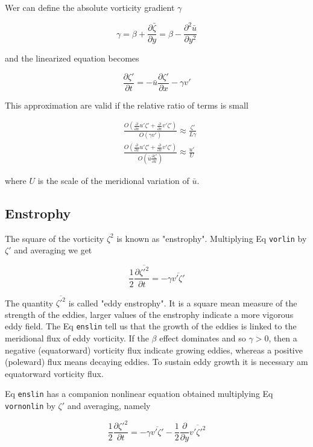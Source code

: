 Wer can define the absolute vorticity gradient \(\gamma\)

\[\gamma = \beta + \frac{\partial \bar{\zeta}}{\partial y} = \beta - \frac{\partial^{2} \bar{u}}{\partial y^{2}}\]

and the linearized equation becomes

{\[\frac{\partial \zeta'}{\partial t} = -\bar{u}\frac{\partial \zeta'}{\partial x} -\gamma v'\]}

This approximation are valid if the relative ratio of terms is small

\[\begin{aligned}
&\frac{O(\frac{\partial }{\partial x}u'\zeta'+ \frac{\partial }{\partial x} v'\zeta')}{O(\gamma v')} \approx \frac{\zeta'}{L\gamma} \\
&\frac{O(\frac{\partial }{\partial x}u'\zeta'+ \frac{\partial }{\partial x} v'\zeta')}{O(\bar{u}\frac{\partial \zeta'}{\partial x})} \approx \frac{u'}{U}
\end{aligned}\]

where \(U\) is the scale of the meridional variation of \(\bar{u}\).

\subsection{Enstrophy}\label{enstrophy}

The square of the vorticity \(\zeta^2\) is known as "enstrophy".
Multiplying Eq \texttt{vorlin} by \(\zeta'\) and averaging we get

{\[\frac{1}{2}\frac{\partial \overline{\zeta'^2}}{\partial t} = -\gamma\overline{v'\zeta'}\]}

The quantity \(\overline{\zeta'^2}\) is called "eddy enstrophy". It is a
square mean measure of the strength of the eddies, larger values of the
enstrophy indicate a more vigorous eddy field. The Eq \texttt{enslin}
tell us that the growth of the eddies is linked to the meridional flux
of eddy vorticity. If the \(\beta\) effect dominates and so
\(\gamma > 0\), then a negative (equatorward) vorticity flux indicate
growing eddies, whereas a positive (poleward) flux means decaying
eddies. To sustain eddy growth it is necessary am equatorward vorticity
flux.

Eq \texttt{enslin} has a companion nonlinear equation obtained
multiplying Eq \texttt{vornonlin} by \(\zeta'\) and averaging, namely

{\[\frac{1}{2}\frac{\partial \zeta'^2}{\partial t} = -\gamma\overline{v'\zeta'} -\frac{1}{2}\frac{\partial }{\partial y}\overline{v'\zeta'^2}\]}

